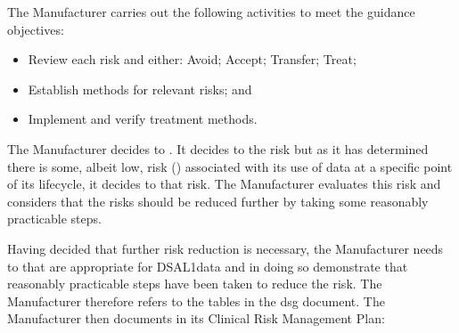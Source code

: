 \begin{minipage}[t]{0.73\textwidth}
  The Manufacturer carries out the following activities to meet the guidance objectives:
  \begin{itemize}
    \item Review each risk and either: Avoid; Accept; Transfer; Treat;
    \item Establish  methods for relevant risks; and
    \item Implement and verify treatment methods.
  \end{itemize}
\end{minipage}
\begin{minipage}[t]{0.25\textwidth}
  \centering{}
\end{minipage}

The Manufacturer decides to . It decides to  the  risk but as it has determined there is some, albeit low, risk () associated with its use of data at a specific point of its lifecycle, it decides to  that risk. The Manufacturer evaluates this risk and considers that the risks should be reduced further by taking some reasonably practicable steps.

Having decided that further risk reduction is necessary, the Manufacturer needs to  that are appropriate for DSAL1data and in doing so demonstrate that reasonably practicable steps have been taken to reduce the risk. The Manufacturer therefore refers to the tables in the \gls{dsg} document. The Manufacturer then documents in its Clinical Risk Management Plan:

